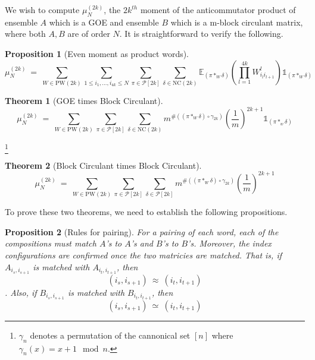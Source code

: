 \documentclass{article}
\newcommand{\PW}{\text{PW}}
\newcommand{\NC}{\text{NC}}
\newtheorem{theorem}{Theorem}
\newtheorem{prop}{Proposition}
\begin{document}

We wish to compute $\mu_N^{(2k)}$, the $2k^{th}$ moment of 
the anticommutator product of ensemble $A$ which is a GOE 
and ensemble $B$ which is a m-block circulant matrix, 
where both $A, B$ are of order $N$. It is straightforward to 
verify the following. 

\begin{prop}[Even moment as product words]
    \label{thm:baseForm}
    \begin{equation}
        \mu_N^{(2k)} \ = \ 
        \sum_{W\in \PW(2k)}
        \sum_{1 \leq i_1 , \dots, i_{4k} \leq N}
        \sum_{\pi \in \mathcal P[2k]}  
        \sum_{\delta \in \NC(2k)}  
        \mathbb{E}_{(\pi*_W\delta)}\left(
        \prod_{l = 1}^{4k} W^{l}_{i_l i_{l + 1}}
        \right) \mathbb{1}_{(\pi*_W\delta)}
    \end{equation}
\end{prop}

\begin{theorem}[GOE times Block Circulant]
    \label{thm: GOEBC}
    \begin{equation}
        \mu_N^{(2k)} \ = \ 
        \sum_{W \in \PW(2k)}
        \sum_{\pi \in \mathcal P[2k]}  
        \sum_{\delta \in \NC(2k)}   
        m^{
            \#((\pi *_W \delta) \circ \gamma_{2k} )
        }
        \left(
            \frac 1 m
        \right)^{2k + 1}
        \mathbb{1}_{(\pi*_w\delta)}
    \end{equation}
\end{theorem}
\footnote{
    $\gamma_n$ denotes a permutation of the cannonical set $[n]$ 
    where $\gamma_n(x) = x + 1 \mod n$. 
}

\begin{theorem}[Block Circulant times Block Circulant]
    \label{thm:BCBC}
    \begin{equation}
        \mu_N^{(2k)} \ = \ 
        \sum_{W \in \PW(2k)}
        \sum_{\pi \in \mathcal P[2k]}  
        \sum_{\delta \in  \mathcal P[2k]}   
        m^{
            \#((\pi *_W \delta) \circ \gamma_{2k} )
        }
        \left(
            \frac 1 m
        \right)^{2k + 1}
    \end{equation}
\end{theorem}

To prove these two theorems, we need to establish 
the following propositions. 

\begin{prop} [Rules for pairing] \label{thm:pairingRule}
    For a pairing of each word, each of the compositions 
    must match $A$'s to $A$'s and $B$'s to $B$'s. Moreover, 
    the index configurations are confirmed once the 
    two matricies are matched. That is, 
    if $A_{i_s, i_{s + 1}}$ is matched with 
    $A_{i_t, i_{t + 1}}$, then 
    \begin{equation}
        (i_s, i_{s + 1}) \ \approx \ (i_t, i_{t + 1})
    \end{equation}. Also, 
    if $B_{i_s, i_{s + 1}}$ is matched with 
    $B_{i_t, i_{t + 1}}$, then 
    \begin{equation}
        (i_s, i_{s + 1}) \ \simeq \  (i_t, i_{t + 1})
    \end{equation}
\end{prop}
\end{document}
